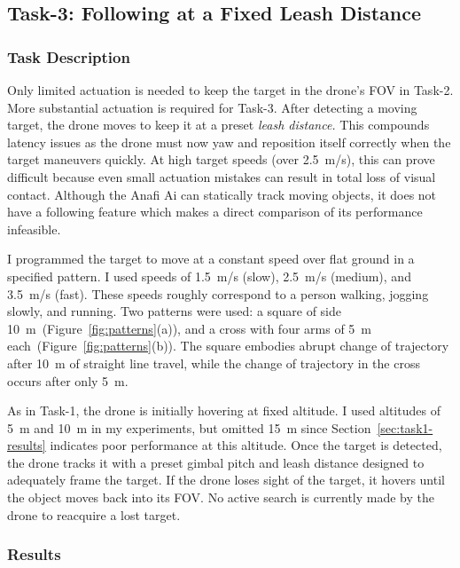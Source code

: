 \subsection{Task-3: Following at a Fixed Leash Distance}
\label{sec:task3}

\subsubsection{Task Description}
\label{sec:task3-desc}

Only limited actuation is needed to keep the target in the
drone's FOV in Task-2.  More substantial actuation is required for
Task-3.  After detecting a moving target, the drone moves to keep it
at a preset {\em leash distance.} This compounds latency issues as the
drone must now yaw and reposition itself correctly when the target
maneuvers quickly. At high target speeds (over 2.5~m/s), this can
prove difficult because even small actuation mistakes can result in
total loss of visual contact. Although the Anafi Ai can statically
track moving objects, it does not have a 
following feature which makes a direct comparison of its performance infeasible.

I programmed the target to move at a constant speed over flat ground
in a specified pattern.  I used speeds of 1.5~m/s (slow), 2.5~m/s
(medium), and 3.5~m/s (fast).  These speeds roughly correspond to a
person walking, jogging slowly, and running.  Two patterns were used:
a square of side 10~m~(Figure~\ref{fig:patterns}(a)), and a cross with
four arms of 5~m each~(Figure~\ref{fig:patterns}(b)).  The square
embodies abrupt change of trajectory after 10~m of straight line travel,
while the change of trajectory in the cross occurs after only 5~m.

As in Task-1, the drone is initially hovering at fixed altitude.  I used altitudes of 5~m and 10~m in my experiments, but omitted 15~m
since Section~\ref{sec:task1-results} indicates poor performance at this altitude. Once the target is detected, the drone tracks it with a
preset gimbal pitch and leash distance designed to adequately frame
the target. If the drone loses sight of the target, it hovers until
the object moves back into its FOV. No active search is currently made
by the drone to reacquire a lost target.

\subsubsection{Results}
\label{sec:task3-results}

